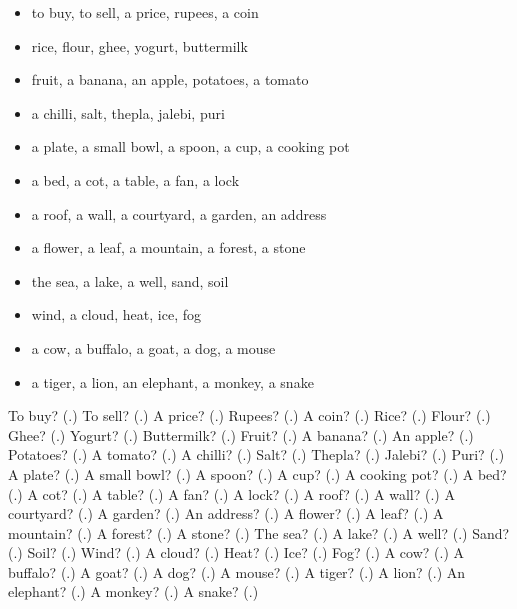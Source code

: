 \begin{itemize}
\raggedright
  \item to buy, to sell, a price, rupees, a coin
  \item rice, flour, ghee, yogurt, buttermilk
  \item fruit, a banana, an apple, potatoes, a tomato
  \item a chilli, salt, thepla, jalebi, puri
  \item a plate, a small bowl, a spoon, a cup, a cooking pot
  \item a bed, a cot, a table, a fan, a lock
  \item a roof, a wall, a courtyard, a garden, an address
  \item a flower, a leaf, a mountain, a forest, a stone
  \item the sea, a lake, a well, sand, soil
  \item wind, a cloud, heat, ice, fog
  \item a cow, a buffalo, a goat, a dog, a mouse
  \item a tiger, a lion, an elephant, a monkey, a snake
\end{itemize}

\begin{tcolorbox}[breakable,colback=teal!4,colframe=teal!35!black,title={Before you move on}]
To buy? (\textbf{}.) To sell? (\textbf{}.) A price? (\textbf{}.) Rupees? (\textbf{}.) A coin? (\textbf{}.) Rice? (\textbf{}.) Flour? (\textbf{}.) Ghee? (\textbf{}.) Yogurt? (\textbf{}.) Buttermilk? (\textbf{}.) Fruit? (\textbf{}.) A banana? (\textbf{}.) An apple? (\textbf{}.) Potatoes? (\textbf{}.) A tomato? (\textbf{}.) A chilli? (\textbf{}.) Salt? (\textbf{}.) Thepla? (\textbf{}.) Jalebi? (\textbf{}.) Puri? (\textbf{}.) A plate? (\textbf{}.) A small bowl? (\textbf{}.) A spoon? (\textbf{}.) A cup? (\textbf{}.) A cooking pot? (\textbf{}.) A bed? (\textbf{}.) A cot? (\textbf{}.) A table? (\textbf{}.) A fan? (\textbf{}.) A lock? (\textbf{}.) A roof? (\textbf{}.) A wall? (\textbf{}.) A courtyard? (\textbf{}.) A garden? (\textbf{}.) An address? (\textbf{}.) A flower? (\textbf{}.) A leaf? (\textbf{}.) A mountain? (\textbf{}.) A forest? (\textbf{}.) A stone? (\textbf{}.) The sea? (\textbf{}.) A lake? (\textbf{}.) A well? (\textbf{}.) Sand? (\textbf{}.) Soil? (\textbf{}.) Wind? (\textbf{}.) A cloud? (\textbf{}.) Heat? (\textbf{}.) Ice? (\textbf{}.) Fog? (\textbf{}.) A cow? (\textbf{}.) A buffalo? (\textbf{}.) A goat? (\textbf{}.) A dog? (\textbf{}.) A mouse? (\textbf{}.) A tiger? (\textbf{}.) A lion? (\textbf{}.) An elephant? (\textbf{}.) A monkey? (\textbf{}.) A snake? (\textbf{}.)
\end{tcolorbox}
